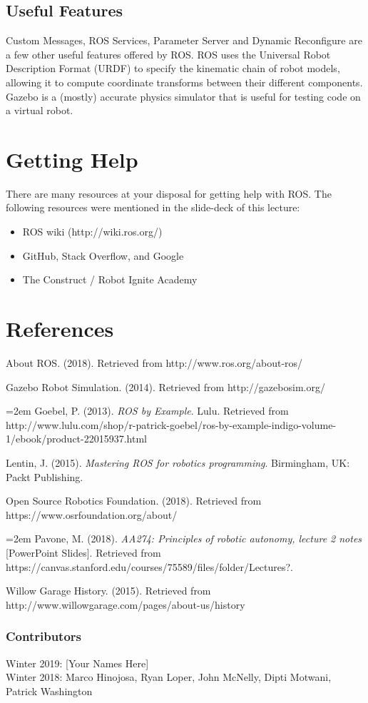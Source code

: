 \documentclass[twoside]{article}
\begin{document}
\subsection{Useful Features}
Custom Messages, ROS Services, Parameter Server and Dynamic Reconfigure are a few other useful features offered by ROS. ROS uses the Universal Robot Description Format (URDF) to specify the kinematic chain of robot models, allowing it to compute coordinate transforms between their different components. Gazebo is a (mostly) accurate physics simulator that is useful for testing code on a virtual robot.
\section{Getting Help}

There are many resources at your disposal for getting help with ROS. The following resources were mentioned in the slide-deck of this lecture:

\begin{itemize}
\item ROS wiki (http://wiki.ros.org/)
\item GitHub, Stack Overflow, and Google
\item The Construct / Robot Ignite Academy
\end{itemize}

\section{References}
About ROS. (2018). Retrieved from http://www.ros.org/about-ros/

Gazebo Robot Simulation. (2014). Retrieved from http://gazebosim.org/

\hangindent=2em
Goebel, P. (2013). \textit{ROS by Example}. Lulu. Retrieved from http://www.lulu.com/shop/r-patrick-goebel/ros-by-example-indigo-volume-1/ebook/product-22015937.html

Lentin, J. (2015). {\it Mastering ROS for robotics programming}. Birmingham, UK: Packt Publishing.

Open Source Robotics Foundation. (2018). Retrieved from https://www.osrfoundation.org/about/


\hangindent=2em
Pavone, M. (2018). {\it AA274: Principles of robotic autonomy, lecture 2 notes} [PowerPoint Slides]. Retrieved from https://canvas.stanford.edu/courses/75589/files/folder/Lectures?.

Willow Garage History. (2015). Retrieved from http://www.willowgarage.com/pages/about-us/history


\subsubsection{Contributors}
Winter 2019: [Your Names Here]
\\
Winter 2018: Marco Hinojosa, Ryan Loper, John McNelly, Dipti Motwani, Patrick Washington
\end{document}
